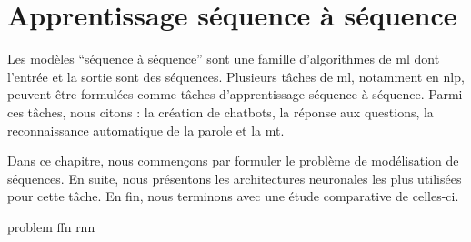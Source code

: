 \chapter{Apprentissage séquence à séquence}

Les modèles ``séquence à séquence'' sont une famille d'algorithmes de \acrfull{ml}
dont l'entrée et la sortie sont des séquences.
Plusieurs tâches de \acrlong{ml}, notamment en \acrfull{nlp}, 
peuvent être formulées comme tâches d'apprentissage séquence à séquence.
Parmi ces tâches, nous citons : la création de chatbots, la réponse aux questions, 
la reconnaissance automatique de la parole et la \acrlong{mt}.

Dans ce chapitre, nous commençons par formuler le problème de modélisation de séquences.
En suite, nous présentons les architectures neuronales les plus utilisées pour cette tâche.
En fin, nous terminons avec une étude comparative de celles-ci.

{problem}
{ffn}
{rnn}

